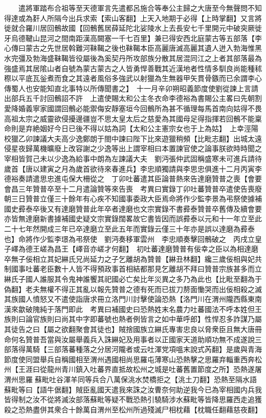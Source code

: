 　　遣將軍踏布合祖等至天德軍言先遣都呂施合等奉公主歸之大唐至今無聲問不知得達或為姧人所隔今出兵求索【索山客翻】上天入地期于必得【上時掌翻】又言將徙就合羅川居回鶻故國【回鶻舊居薛延陀北娑陵水上去長安七千里開元中破突厥徙牙烏德鞬山昆河之間南距漢高闕塞一千七百里】兼已得安西北庭蒙古等五部落【李心傳曰蒙古之先世居斡難河靺鞨之後也靺鞨本臣高麗唐滅高麗其遺人迸入勃海惟黑水完彊及勃海盛靺鞨皆役屬後為奚契丹所攻部族分散其居混同江之上者其部落最為強盛焉其居隂山者自號為蒙古蒙古之人皆勇悍善戰其近漢地者性情多馴良尚能種秫穄以平底瓦釡煮而食之其遠者風俗多強武以射獵為生無器甲矢貫骨鏃而已余謂李心傳蜀人也安能知直北事特以所傳聞書之】　十一月辛卯朔昭義節度使劉從諫上言請出部兵五千討回鶻詔不許　上遣使賜太和公主冬衣命李德裕為書賜公主畧曰先朝割愛降婚義寧家國謂回鶻必能禦侮安靜塞垣今回鶻所為甚不循理每馬首南向姑得不畏高祖太宗之威靈欲侵擾邊疆豈不思太皇太后之慈愛為其國母足得指揮若回鶻不能稟命則是弃絶姻好今日已後不得以姑為詞【太和公主憲宗女也于上為姑】　上幸涇陽校獵乙卯諫議大夫高少逸鄭朗于閤中諫曰陛下比來遊獵稍頻【比毗志翻】出城太遠侵星夜歸萬機曠廢上改容謝之少逸等出上謂宰相曰本置諫官使之論事朕欲時時聞之宰相皆賀己未以少逸為給事中朗為左諫議大夫　劉沔張仲武固稱盛寒未可進兵請待歲首【唐以建寅之月為歲首欲待來春進兵】李忠順獨請與李思忠俱進十二月丙寅李德裕奏請遣思忠進屯保大柵從之　丁卯吐蕃遣其臣論普熱來告達磨贊普之喪【會要會昌三年贊普卒至十二月遣論贊等來告喪　考異曰實錄丁卯吐蕃贊普卒遣使告喪廢朝三日贊普立僅三十餘年有心疾不知國事委政大臣焉命將作少監李景為弔祭使據補國史彛泰卒後又有達磨贊普此年卒者達磨也文宗實錄不書彛泰贊普卒舊傳及續會要亦皆無達磨新書據補國史疑文宗實錄闊畧故它書皆因而誤彛泰以元和十一年立至此二十七年然開成三年已卒達磨立至此五年而實錄云僅三十年亦是誤以達磨為彛泰也】命將作少監李璟為弔祭使　劉沔奏移軍雲州　李忠順奏擊回鶻破之　丙戌立皇子嶧為德王嵯為昌王【嶧音亦嵯才何翻】　初吐蕃達磨贊普有佞幸之臣以為相達磨卒無子佞相立其妃綝氏兄尚延力之子乞離胡為贊普【綝丑林翻】纔三歲佞相與妃共制國事吐蕃老臣數十人皆不得預政事首相結都那見乞離胡不拜曰贊普宗族甚多而立綝氏子國人誰服其令鬼神誰饗其祀國必亡矣比年災異之多乃為此也【比毗至翻為于偽翻】老夫無權不得正其亂以報先贊普之德有死而已拔刀剺面慟哭而出佞相殺之滅其族國人憤怒又不遣使詣唐求冊立洛門川討擊使論恐熱【洛門川在渭州隴西縣東南漢來歙破隗純于落門即此　考異曰補國史曰恐熱姓末名農力吐蕃國法不呼本姓但王族則曰論官族則曰尚其中字即蕃號也熱者例皆言之如中華呼郎】性悍忍多詐謀乃屬其徒告之曰【屬之欲翻聚會其徒也】賊捨國族立綝氏專害忠良以脅衆臣且無大唐冊命何名贊普吾當與汝屬舉義兵入誅綝妃及用事者以正國家天道助順功無不成遂說三部落得萬騎【三部落蕃種落之分居河隴者或云吐渾党項嗢末說式芮翻】是歲與青海節度使同盟舉兵自稱國相至渭州遇國相尚思羅屯薄寒山恐熱擊之思羅弃輜重西奔松州【王涯曰從龍州青川鎮入吐蕃界直抵故松州之城是吐蕃舊置節度之所】恐熱遂屠渭州思羅蘇毗吐谷渾羊同等兵合八萬保洮水焚橋拒之【洮土刀翻】恐熱至隔水語蘇毗等曰【語牛倨翻】賊臣亂國天遣我來誅之汝曹奈何助逆我今已為宰相國内兵我皆得制之汝不從將滅汝部落蘇毗等疑不戰恐熱引驍騎涉水蘇毗等皆降思羅西走追獲殺之恐熱盡併其衆合十餘萬自渭州至松州所過殘滅尸相枕藉【枕職任翻藉慈夜翻】

